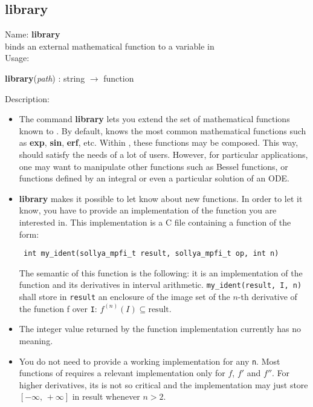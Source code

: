 \subsection{library}
\label{lablibrary}
\noindent Name: \textbf{library}\\
binds an external mathematical function to a variable in \sollya\\
\noindent Usage: 
\begin{center}
\textbf{library}(\emph{path}) : \textsf{string} $\rightarrow$ \textsf{function}\\
\end{center}
\noindent Description: \begin{itemize}

\item The command \textbf{library} lets you extend the set of mathematical
   functions known to \sollya.
   By default, \sollya knows the most common mathematical functions such
   as \textbf{exp}, \textbf{sin}, \textbf{erf}, etc. Within \sollya, these functions may be
   composed. This way, \sollya should satisfy the needs of a lot of
   users. However, for particular applications, one may want to
   manipulate other functions such as Bessel functions, or functions
   defined by an integral or even a particular solution of an ODE.

\item \textbf{library} makes it possible to let \sollya know about new functions. In
   order to let it know, you have to provide an implementation of the
   function you are interested in. This implementation is a C file containing
   a function of the form:
   \begin{verbatim} int my_ident(sollya_mpfi_t result, sollya_mpfi_t op, int n)\end{verbatim}
   The semantic of this function is the following: it is an implementation of
   the function and its derivatives in interval arithmetic.
   \verb|my_ident(result, I, n)| shall store in \verb|result| an enclosure 
   of the image set of the $n$-th derivative
   of the function f over \verb|I|: $f^{(n)}(I) \subseteq \mathrm{result}$.

\item The integer value returned by the function implementation currently has no meaning.

\item You do not need to provide a working implementation for any \verb|n|. Most functions
   of \sollya requires a relevant implementation only for $f$, $f'$ and $f''$. For higher 
   derivatives, its is not so critical and the implementation may just store 
   $[-\infty,\,+\infty]$ in result whenever $n>2$.


\end{itemize}
